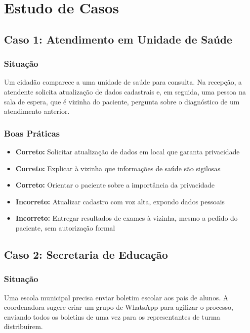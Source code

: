 \documentclass[12pt,a4paper]{article}
\begin{document}
\newpage
\section{Estudo de Casos}

\subsection{Caso 1: Atendimento em Unidade de Saúde}

\subsubsection{Situação}
Um cidadão comparece a uma unidade de saúde para consulta. Na recepção, a atendente solicita atualização de dados cadastrais e, em seguida, uma pessoa na sala de espera, que é vizinha do paciente, pergunta sobre o diagnóstico de um atendimento anterior.

\subsubsection{Boas Práticas}
\begin{itemize}
    \item \textbf{Correto:} Solicitar atualização de dados em local que garanta privacidade
    \item \textbf{Correto:} Explicar à vizinha que informações de saúde são sigilosas
    \item \textbf{Correto:} Orientar o paciente sobre a importância da privacidade
    \item \textbf{Incorreto:} Atualizar cadastro com voz alta, expondo dados pessoais
    \item \textbf{Incorreto:} Entregar resultados de exames à vizinha, mesmo a pedido do paciente, sem autorização formal
\end{itemize}

\subsection{Caso 2: Secretaria de Educação}

\subsubsection{Situação}
Uma escola municipal precisa enviar boletim escolar aos pais de alunos. A coordenadora sugere criar um grupo de WhatsApp para agilizar o processo, enviando todos os boletins de uma vez para os representantes de turma distribuírem.
\end{document}
